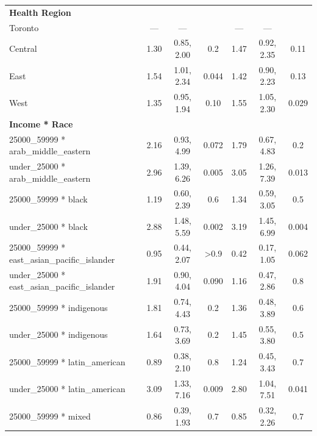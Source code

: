 \documentclass[
  letterpaper,
  DIV=11,
  numbers=noendperiod]{scrartcl}
\begin{document}
\begin{longtable}{lcccccc}
\textbf{Health Region} &  &  &  &  &  & \\
\hspace{1em}Toronto & — & — &  & — & — & \\
\hspace{1em}Central & 1.30 & 0.85, 2.00 & 0.2 & 1.47 & 0.92, 2.35 & 0.11\\
\hspace{1em}East & 1.54 & 1.01, 2.34 & 0.044 & 1.42 & 0.90, 2.23 & 0.13\\
\hspace{1em}West & 1.35 & 0.95, 1.94 & 0.10 & 1.55 & 1.05, 2.30 & 0.029\\
\textbf{Income * Race} &  &  &  &  &  & \\
\hspace{1em}25000\_59999 * arab\_middle\_eastern & 2.16 & 0.93, 4.99 & 0.072 & 1.79 & 0.67, 4.83 & 0.2\\
\hspace{1em}under\_25000 * arab\_middle\_eastern & 2.96 & 1.39, 6.26 & 0.005 & 3.05 & 1.26, 7.39 & 0.013\\
\hspace{1em}25000\_59999 * black & 1.19 & 0.60, 2.39 & 0.6 & 1.34 & 0.59, 3.05 & 0.5\\
\hspace{1em}under\_25000 * black & 2.88 & 1.48, 5.59 & 0.002 & 3.19 & 1.45, 6.99 & 0.004\\
\hspace{1em}25000\_59999 * east\_asian\_pacific\_islander & 0.95 & 0.44, 2.07 & >0.9 & 0.42 & 0.17, 1.05 & 0.062\\
\hspace{1em}under\_25000 * east\_asian\_pacific\_islander & 1.91 & 0.90, 4.04 & 0.090 & 1.16 & 0.47, 2.86 & 0.8\\
\hspace{1em}25000\_59999 * indigenous & 1.81 & 0.74, 4.43 & 0.2 & 1.36 & 0.48, 3.89 & 0.6\\
\hspace{1em}under\_25000 * indigenous & 1.64 & 0.73, 3.69 & 0.2 & 1.45 & 0.55, 3.80 & 0.5\\
\hspace{1em}25000\_59999 * latin\_american & 0.89 & 0.38, 2.10 & 0.8 & 1.24 & 0.45, 3.43 & 0.7\\
\hspace{1em}under\_25000 * latin\_american & 3.09 & 1.33, 7.16 & 0.009 & 2.80 & 1.04, 7.51 & 0.041\\
\hspace{1em}25000\_59999 * mixed & 0.86 & 0.39, 1.93 & 0.7 & 0.85 & 0.32, 2.26 & 0.7\\

\end{longtable}
\end{document}
